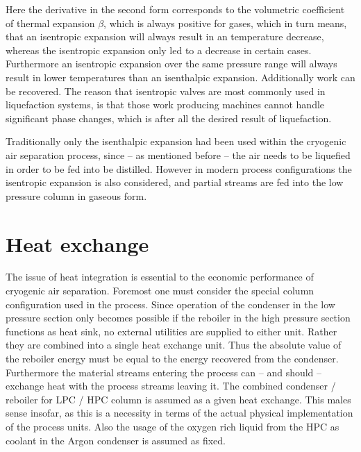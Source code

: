         Here the derivative in the second form corresponds to the volumetric coefficient of thermal expansion
        $\beta$, which is always positive for gases, which in turn means, that an isentropic expansion
        will always result in an temperature decrease, whereas the isentropic expansion only led to a decrease in
        certain cases. Furthermore an isentropic expansion over the same pressure range will always result in
        lower temperatures than an isenthalpic expansion. Additionally work can be recovered. The reason
        that isentropic valves are most commonly used in liquefaction systems, is that those work producing
        machines cannot handle significant phase changes, which is after all the desired result of liquefaction.

        Traditionally only the isenthalpic expansion had been used within the cryogenic air separation process,
        since -- as mentioned before -- the air needs to be liquefied in order to be fed into be distilled. However
        in modern process configurations the isentropic expansion is also considered, and partial streams are fed into
        the low pressure column in gaseous form.


\section{Heat exchange}
\label{sec:heat_exchange}
    The issue of heat integration is essential to the economic performance of cryogenic air separation. Foremost
    one must consider the special column configuration used in the process. Since operation of the condenser in the
    low pressure section only becomes possible if the reboiler in the high pressure section functions as heat sink,
    no external utilities are supplied to either unit. Rather they are combined into a single heat exchange unit. Thus
    the absolute value of the reboiler energy must be equal to the energy recovered from the condenser. Furthermore
    the material streams entering the process can -- and should -- exchange heat with the process streams leaving it.
    The combined condenser / reboiler for LPC / HPC column is assumed as a given heat exchange. This males sense insofar,
    as this is a necessity in terms of the actual physical implementation of the process units. Also the usage of the
    oxygen rich liquid from the HPC as coolant in the Argon condenser is assumed as fixed.

